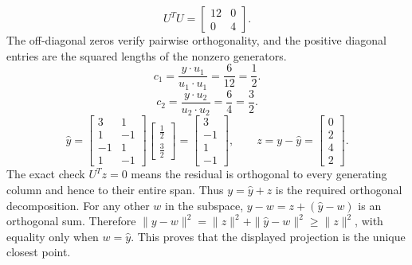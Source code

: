 \[U^TU=\left[\begin{array}{rr}12&0\\0&4\end{array}\right].\]
The off-diagonal zeros verify pairwise orthogonality, and the positive diagonal entries are the squared lengths of the nonzero generators.
\[c_{1}=\frac{y\cdot u_{1}}{u_{1}\cdot u_{1}}=\frac{6}{12}=\frac{1}{2}.\]
\[c_{2}=\frac{y\cdot u_{2}}{u_{2}\cdot u_{2}}=\frac{6}{4}=\frac{3}{2}.\]
\[\widehat y=\left[\begin{array}{rr}3&1\\1&-1\\-1&1\\1&-1\end{array}\right]\left[\begin{array}{r}\frac{1}{2}\\\frac{3}{2}\end{array}\right]=\left[\begin{array}{r}3\\-1\\1\\-1\end{array}\right],\qquad z=y-\widehat y=\left[\begin{array}{r}0\\2\\4\\2\end{array}\right].\]
The exact check $U^Tz=0$ means the residual is orthogonal to every generating column and hence to their entire span. Thus $y=\widehat y+z$ is the required orthogonal decomposition.
For any other $w$ in the subspace, $y-w=z+(\widehat y-w)$ is an orthogonal sum. Therefore $\|y-w\|^2=\|z\|^2+\|\widehat y-w\|^2\ge\|z\|^2$, with equality only when $w=\widehat y$. This proves that the displayed projection is the unique closest point.


